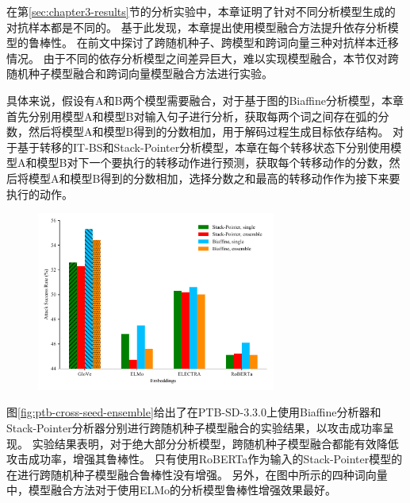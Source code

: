 在第\ref{sec:chapter3-results}节的分析实验中，本章证明了针对不同分析模型生成的对抗样本都是不同的。
基于此发现，本章提出使用模型融合方法提升依存分析模型的鲁棒性。
在前文中探讨了跨随机种子、跨模型和跨词向量三种对抗样本迁移情况。
由于不同的依存分析模型之间差异巨大，难以实现模型融合，本节仅对跨随机种子模型融合和跨词向量模型融合方法进行实验。

具体来说，假设有A和B两个模型需要融合，对于基于图的Biaffine分析模型，本章首先分别用模型A和模型B对输入句子进行分析，获取每两个词之间存在弧的分数，然后将模型A和模型B得到的分数相加，用于解码过程生成目标依存结构。
对于基于转移的IT-BS和Stack-Pointer分析模型，本章在每个转移状态下分别使用模型A和模型B对下一个要执行的转移动作进行预测，获取每个转移动作的分数，然后将模型A和模型B得到的分数相加，选择分数之和最高的转移动作作为接下来要执行的动作。

\begin{figure}[hbtp]
	\centering
	\includegraphics[width=0.7\textwidth]{figures/ensemble_seed_attack_succ.pdf}
\end{figure}

图\ref{fig:ptb-cross-seed-ensemble}给出了在PTB-SD-3.3.0上使用Biaffine分析器和Stack-Pointer分析器分别进行跨随机种子模型融合的实验结果，以攻击成功率呈现。
实验结果表明，对于绝大部分分析模型，跨随机种子模型融合都能有效降低攻击成功率，增强其鲁棒性。
只有使用RoBERTa作为输入的Stack-Pointer模型的在进行跨随机种子模型融合鲁棒性没有增强。
另外，在图中所示的四种词向量中，模型融合方法对于使用ELMo的分析模型鲁棒性增强效果最好。

